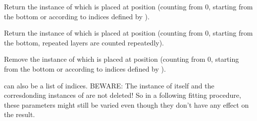 \documentclass[letterpaper,10pt,english]{sphinxmanual}
\begin{document}
\begin{fulllineitems}
\begin{fulllineitems}
\end{fulllineitems}


\begin{fulllineitems}
\label{\detokenize{modules-api/samplerepresentation:SampleRepresentation.Heterostructure.getLayer}}
Return the instance of {\hyperref[\detokenize{modules-api/samplerepresentation:SampleRepresentation.LayerObject}]{}} which is placed at position  (counting from 0, starting from the bottom or according to indices defined by ).

\end{fulllineitems}


\begin{fulllineitems}
\label{\detokenize{modules-api/samplerepresentation:SampleRepresentation.Heterostructure.getTotalLayer}}
Return the instance of {\hyperref[\detokenize{modules-api/samplerepresentation:SampleRepresentation.LayerObject}]{}} which is placed at position  (counting from 0, starting from the bottom, repeated layers are counted repeatedly).

\end{fulllineitems}


\begin{fulllineitems}
\label{\detokenize{modules-api/samplerepresentation:SampleRepresentation.Heterostructure.removeLayer}}
Remove the instance of {\hyperref[\detokenize{modules-api/samplerepresentation:SampleRepresentation.LayerObject}]{}} which is placed at position  (counting from 0, starting from the bottom or according to indices defined by ).

 can also be a list of indices.
BEWARE: The instance of {\hyperref[\detokenize{modules-api/samplerepresentation:SampleRepresentation.LayerObject}]{}} itself and the corresdonding instances of {\hyperref[\detokenize{modules-api/parameters:Parameters.Fitparameter}]{}} are not deleted! So in a following fitting procedure, these parameters might still be varied even though they don’t have any effect on the result.


\end{fulllineitems}
\end{fulllineitems}
\end{document}
